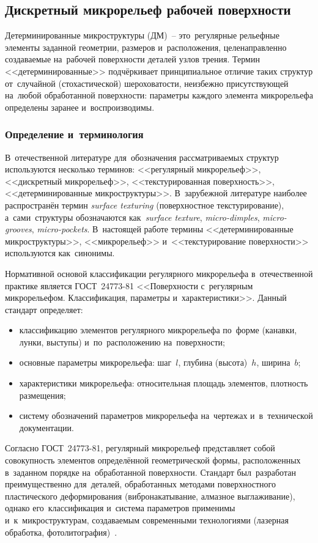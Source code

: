 \subsection{Дискретный микрорельеф рабочей поверхности}

Детерминированные микроструктуры (ДМ)~-- это~регулярные рельефные элементы заданной геометрии, размеров и~расположения, целенаправленно создаваемые на~рабочей поверхности деталей узлов трения. Термин <<детерминированные>> подчёркивает принципиальное отличие таких структур от~случайной (стохастической) шероховатости, неизбежно присутствующей на~любой обработанной поверхности: параметры каждого элемента микрорельефа определены заранее и~воспроизводимы.

\subsubsection{Определение и~терминология}

В~отечественной литературе для~обозначения рассматриваемых структур используются несколько терминов: <<регулярный микрорельеф>>, <<дискретный микрорельеф>>, <<текстурированная поверхность>>, <<детерминированные микроструктуры>>. В~зарубежной литературе наиболее распространён термин \textit{surface texturing} (поверхностное текстурирование), а~сами~структуры обозначаются как~\textit{surface texture}, \textit{micro-dimples}, \textit{micro-grooves}, \textit{micro-pockets}. В~настоящей работе термины <<детерминированные микроструктуры>>, <<микрорельеф>> и~<<текстурирование поверхности>> используются как~синонимы.

Нормативной основой классификации регулярного микрорельефа в~отечественной практике является ГОСТ~24773-81 <<Поверхности с~регулярным микрорельефом. Классификация, параметры и~характеристики>>. Данный стандарт определяет:
\begin{itemize}
\item классификацию элементов регулярного микрорельефа по~форме (канавки, лунки, выступы) и~по~расположению на~поверхности;
\item основные параметры микрорельефа: шаг~$l$, глубина (высота)~$h$, ширина~$b$;
\item характеристики микрорельефа: относительная площадь элементов, плотность размещения;
\item систему обозначений параметров микрорельефа на~чертежах и~в~технической документации.
\end{itemize}

Согласно ГОСТ~24773-81, регулярный микрорельеф представляет собой совокупность элементов определённой геометрической формы, расположенных в~заданном порядке на~обработанной поверхности. Стандарт был~разработан преимущественно для~деталей, обработанных методами поверхностного пластического деформирования (вибронакатывание, алмазное выглаживание), однако его~классификация и~система параметров применимы и~к~микроструктурам, создаваемым современными технологиями (лазерная обработка, фотолитография)~\cite{bashmur2021,bashmur2023b}.

